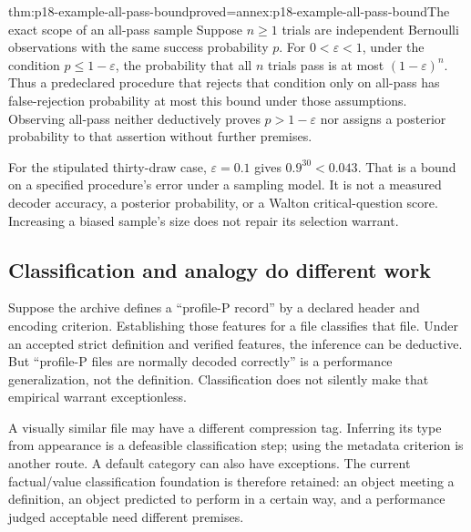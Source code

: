 \begin{hbtheorem}{thm:p18-example-all-pass-bound}{proved=annex:p18-example-all-pass-bound}{The exact scope of an all-pass sample}
Suppose \(n\geq1\) trials are independent Bernoulli observations with the
same success probability \(p\). For \(0<\varepsilon<1\), under the
condition \(p\leq1-\varepsilon\), the probability that all \(n\) trials
pass is at most \((1-\varepsilon)^n\).
Thus a predeclared procedure that rejects that condition only on all-pass
has false-rejection probability at most this bound under those assumptions.
Observing all-pass neither deductively proves \(p>1-\varepsilon\) nor
assigns a posterior probability to that assertion without further premises.
\end{hbtheorem}

For the stipulated thirty-draw case, \(\varepsilon=0.1\) gives
\(0.9^{30}<0.043\). That is a bound on a specified procedure's error
under a sampling model. It is not a measured decoder accuracy, a posterior
probability, or a Walton critical-question score. Increasing a biased sample's
size does not repair its selection warrant.

\subsection{Classification and analogy do different work}
\label{sec:p18-example-classification-analogy}

Suppose the archive defines a ``profile-P record'' by a declared header and
encoding criterion. Establishing those features for a file classifies that
file. Under an accepted strict definition and verified features, the inference
can be deductive. But ``profile-P files are normally decoded correctly'' is
a performance generalization, not the definition. Classification does not
silently make that empirical warrant exceptionless.

A visually similar file may have a different compression tag. Inferring its
type from appearance is a defeasible classification step; using the metadata
criterion is another route. A default category can also have exceptions.
The current factual/value classification foundation is therefore retained:
an object meeting a definition, an object predicted to perform in a certain
way, and a performance judged acceptable need different premises.

